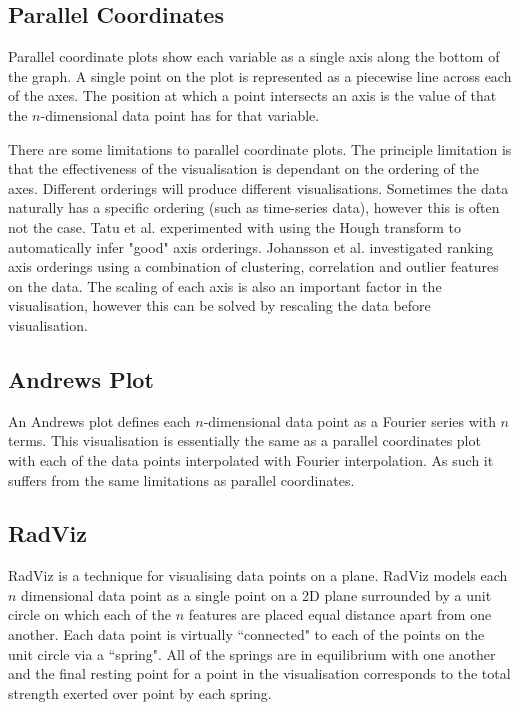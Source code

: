 \subsection{Parallel Coordinates}
Parallel coordinate plots \cite{inselberg1991parallel} show each variable as a single axis along the bottom of the graph. A single point on the plot is represented as a piecewise line across each of the axes. The position at which a point intersects an axis is the value of that the $n$-dimensional data point has for that variable.

There are some limitations to parallel coordinate plots. The principle limitation is that the effectiveness of the visualisation is dependant on the ordering of the axes. Different orderings will produce different visualisations. Sometimes the data naturally has a specific ordering (such as time-series data), however this is often not the case. Tatu et al. \cite{tatu2009combining} experimented with using the Hough transform to automatically infer "good" axis orderings. Johansson et al. \cite{johansson2009interactive} investigated ranking axis orderings using a combination of clustering, correlation and outlier features on the data. The scaling of each axis is also an important factor in the visualisation, however this can be solved by rescaling the data before visualisation.

\subsection{Andrews Plot}
An Andrews plot defines each $n$-dimensional data point as a Fourier series with $n$ terms. This visualisation is essentially the same as a parallel coordinates plot with each of the data points interpolated with Fourier interpolation. As such it suffers from the same limitations as parallel coordinates.

\subsection{RadViz}
RadViz \cite{novakova2009radviz} is a technique for visualising data points on a plane. RadViz models each $n$ dimensional data point as a single point on a 2D plane surrounded by a unit circle on which each of the $n$ features are placed equal distance apart from one another. Each data point is virtually ``connected" to each of the points on the unit circle via a ``spring". All of the springs are in equilibrium with one another and the final resting point for a point in the visualisation corresponds to the total strength exerted over point by each spring.

